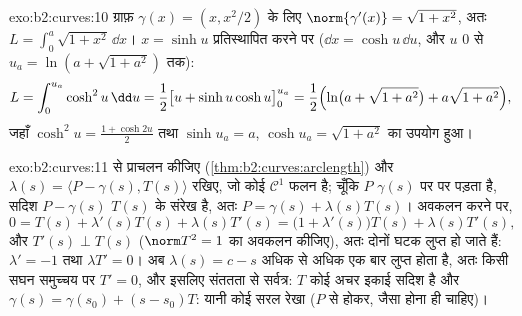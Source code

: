 \begin{solution}{exo:b2:curves:10}
ग्राफ़ $\gamma(x) = (x, x^2/2)$ के लिए $\norm{\gamma'(x)} =
\sqrt{1 + x^2}$, अतः $L = \int_0^a\sqrt{1+x^2}\,\dd x$।
$x = \sinh u$ प्रतिस्थापित करने पर ($\dd x = \cosh u\,\dd u$, और $u$ $0$ से $u_a = \ln(a + \sqrt{1+a^2})$ तक):
\[
L = \int_0^{u_a}\cosh^2 u\,\dd u
= \frac12\bigl[u + \sinh u\cosh u\bigr]_0^{u_a}
= \frac12\Bigl(\ln\bigl(a + \sqrt{1+a^2}\bigr) +
a\sqrt{1+a^2}\Bigr),
\]
जहाँ $\cosh^2 u = \frac{1 + \cosh 2u}2$ तथा $\sinh u_a = a$,
$\cosh u_a = \sqrt{1 + a^2}$ का उपयोग हुआ।
\end{solution}

\begin{solution}{exo:b2:curves:11}
 से प्राचलन कीजिए
(\cref{thm:b2:curves:arclength}) और $\lambda(s) =
\langle P - \gamma(s), T(s)\rangle$ रखिए, जो कोई $\mathcal C^1$
फलन है; चूँकि $P$ $\gamma(s)$ पर  पर पड़ता है,
सदिश $P - \gamma(s)$ $T(s)$ के संरेख है, अतः $P =
\gamma(s) + \lambda(s)T(s)$। अवकलन करने पर,
\[
0 = T(s) + \lambda'(s)T(s) + \lambda(s)T'(s)
= \bigl(1 + \lambda'(s)\bigr)T(s) + \lambda(s)T'(s),
\]
और $T'(s) \perp T(s)$ ($\norm T^2 = 1$ का अवकलन कीजिए), अतः
दोनों घटक लुप्त हो जाते हैं: $\lambda' = -1$ तथा $\lambda T' = 0$।
अब $\lambda(s) = c - s$ अधिक से अधिक एक बार लुप्त होता है, अतः किसी सघन
समुच्चय पर $T' = 0$, और इसलिए संततता से सर्वत्र: $T$ कोई
अचर इकाई सदिश है और $\gamma(s) = \gamma(s_0) + (s -
s_0)T$: यानी कोई सरल रेखा ($P$ से होकर, जैसा होना ही चाहिए)।
\end{solution}

